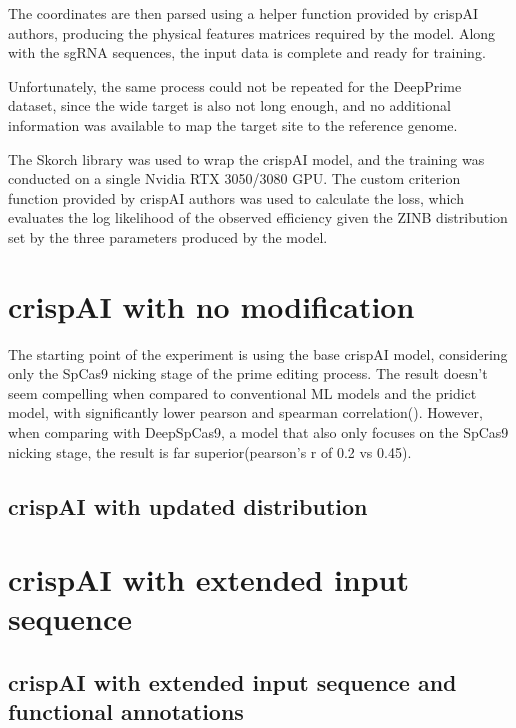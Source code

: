 \documentclass[a4,12pt]{article}
\begin{document}
The coordinates are then parsed using a helper function provided by crispAI authors, producing the physical features matrices required by the model. Along with the sgRNA sequences, the input data is complete and ready for training.

Unfortunately, the same process could not be repeated for the DeepPrime dataset, since the wide target is also not long enough, and no additional information was available to map the target site to the reference genome. 

The Skorch library was used to wrap the crispAI model, and the training was conducted on a single Nvidia RTX 3050/3080 GPU. The custom criterion function provided by crispAI authors was used to calculate the loss, which evaluates the log likelihood of the observed efficiency given the ZINB distribution set by the three parameters produced by the model. 

\section{crispAI with no modification}

The starting point of the experiment is using the base crispAI model, considering only the SpCas9 nicking stage of the prime editing process. The result doesn't seem compelling when compared to conventional ML models and the pridict model, with significantly lower pearson and spearman correlation(). However, when comparing with DeepSpCas9, a model that also only focuses on the SpCas9 nicking stage, the result is far superior(pearson's r of 0.2 vs 0.45).  

\subsection{crispAI with updated distribution}



\section{crispAI with extended input sequence}



\subsection{crispAI with extended input sequence and functional annotations}


\printbibliography
\end{document}
